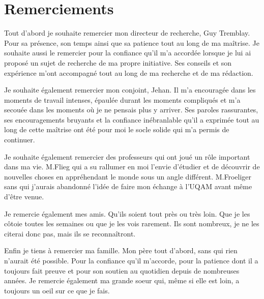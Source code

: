 \chapter*{Remerciements}


Tout d'abord je souhaite remercier mon directeur de recherche, Guy Tremblay.
Pour sa présence, son temps ainsi que sa patience tout au long de ma maîtrise.
Je souhaite aussi le remercier pour la confiance qu'il m'a accordée lorsque je lui ai proposé un sujet de recherche de ma propre initiative.
Ses conseils et son expérience m'ont accompagné tout au long de ma recherche et de ma rédaction.


Je souhaite également remercier mon conjoint, Jehan.
Il m'a encouragée dans les moments de travail intenses, épaulée durant les moments compliqués et m'a secouée dans les moments où je ne pensais plus y arriver. 
Ses paroles rassurantes, ses encouragements bruyants et la confiance inébranlable qu'il a exprimée tout au long de cette maîtrise ont été pour moi le socle solide qui m'a permis de continuer.


Je souhaite également remercier des professeurs qui ont joué un rôle important dans ma vie.
M.Flieg qui a su rallumer en moi l'envie d'étudier et de découvrir de nouvelles choses en appréhendant le monde sous un angle différent.
M.Froeliger sans qui j'aurais abandonné l'idée de faire mon échange à l'UQAM avant même d'être venue.


Je remercie également mes amis.
Qu'ils soient tout près ou très loin.
Que je les côtoie toutes les semaines ou que je les vois rarement.
Ils sont nombreux, je ne les citerai donc pas, mais ils se reconnaîtront.


Enfin je tiens à remercier ma famille.
Mon père tout d'abord, sans qui rien n'aurait été possible.
Pour la confiance qu'il m'accorde, pour la patience dont il a toujours fait preuve et pour son soutien au quotidien depuis de nombreuses années.
Je remercie également ma grande soeur qui, même si elle est loin, a toujours un oeil sur ce que je fais.